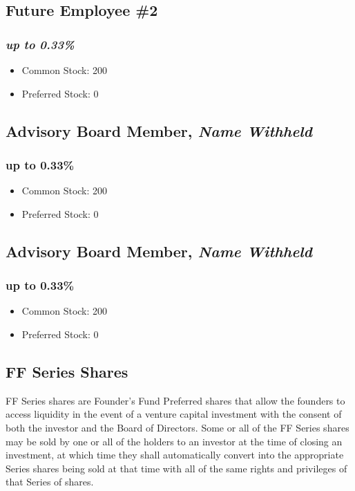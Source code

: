 \documentclass[11pt]{report}
\begin{document}
\subsection{Future Employee \#2}
\subsubsection{\emph{up to 0.33\%}}
\begin{itemize}
\item Common Stock: 200
\item Preferred Stock: 0
\end{itemize}
\subsection{Advisory Board Member, \emph{Name Withheld}}
\subsubsection{up to 0.33\%}
\begin{itemize}
\item Common Stock: 200
\item Preferred Stock: 0
\end{itemize}
\subsection{Advisory Board Member, \emph{Name Withheld}}
\subsubsection{up to 0.33\%}
\begin{itemize}
\item Common Stock: 200
\item Preferred Stock: 0
\end{itemize}
\subsection{FF Series Shares}
\label{ff-series-shares}{\small FF Series shares are Founder's Fund Preferred shares that allow the founders to access liquidity in the event of a venture capital investment with the consent of both the investor and the Board of Directors. Some or all of the FF Series shares may be sold by one or all of the holders to an investor at the time of closing an investment, at which time they shall automatically convert into the appropriate Series shares being sold at that time with all of the same rights and privileges of that Series of shares.\cite{ff-shares}}
\end{document}
